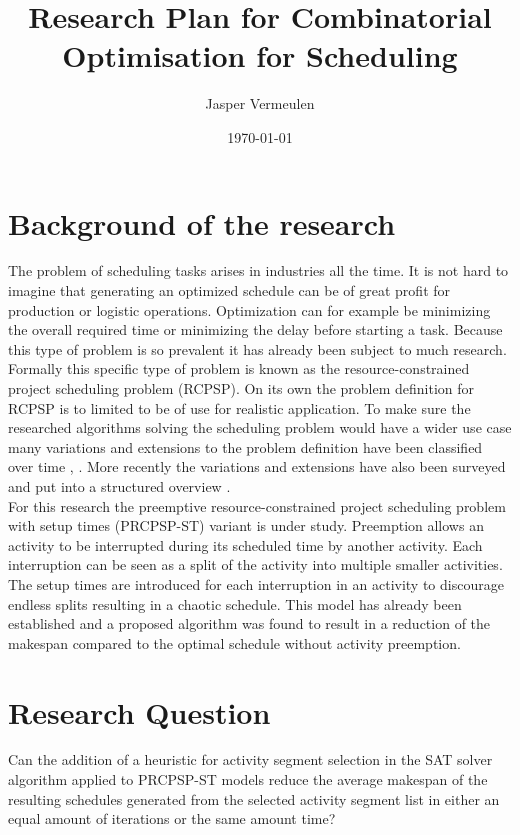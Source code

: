 \documentclass[english]{article}
\title{Research Plan for Combinatorial Optimisation for Scheduling}
\author{Jasper Vermeulen}
\date{\today}
\begin{document}
\maketitle

\section*{Background of the research}
The problem of scheduling tasks arises in industries all the time. It is not hard to imagine that generating an optimized schedule can be of great profit for production or logistic operations.
Optimization can for example be minimizing the overall required time or minimizing the delay before starting a task. Because this type of problem is so prevalent it has already been subject to much research.\\
Formally this specific type of problem is known as the resource-constrained project scheduling problem (RCPSP). On its own the problem definition for RCPSP is to limited to be of use for realistic application. To make sure the researched algorithms solving the scheduling problem would have a wider use case many variations and extensions to the problem definition have been classified over time \cite{RN9}, \cite{RN10}. More recently the variations and extensions have also been surveyed and put into a structured overview \cite{RN6}.\\
For this research the preemptive resource-constrained project scheduling problem with setup times (PRCPSP-ST) variant is under study. Preemption allows an activity to be interrupted during its scheduled time by another activity. Each interruption can be seen as a split of the activity into multiple smaller activities. The setup times are introduced for each interruption in an activity to discourage endless splits resulting in a chaotic schedule. This model has already been established \cite{RN13} and a proposed algorithm was found to result in a reduction of the makespan \cite{RN1} compared to the optimal schedule without activity preemption.\\



\section*{Research Question}
Can the addition of a heuristic for activity segment selection in the SAT solver algorithm applied to PRCPSP-ST models reduce the average makespan of the resulting schedules generated from the selected activity segment list in either an equal amount of iterations or the same amount time?
\end{document}
